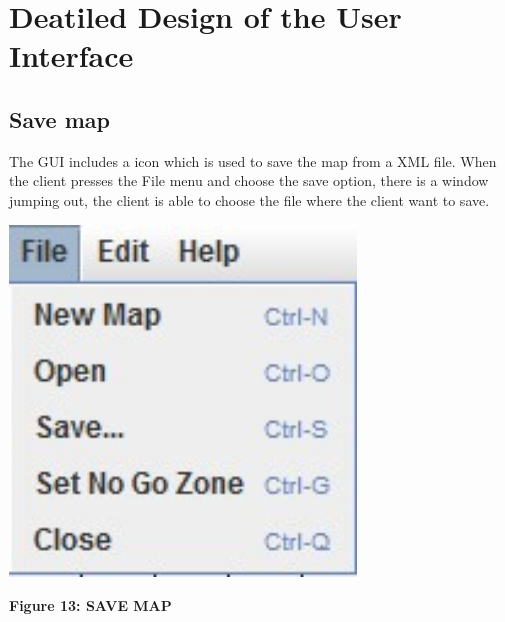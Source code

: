 \documentclass[11pt, a4paper]{report}
\begin{document}
\section{Deatiled Design of the User Interface}
\subsection{Save map}
The GUI includes a icon which is used to save the map from a XML file. When the client presses the File menu and choose the save option, there is a window jumping out, the client is able to choose the file where the client want to save.  
\begin{center}
 \includegraphics[width=9.20cm]{save}
\end{center}
\begin{center}
\textbf {Figure 13: SAVE MAP} \\[0.3cm]
\end{center}
\end{document}
